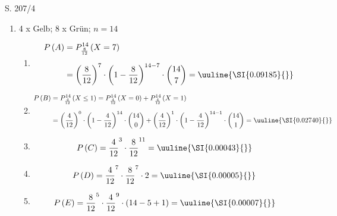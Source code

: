 \begin{Exercise}{S. 207/4}{}
\begin{enumerate}[leftmargin=*]
    \item [4.]{
        4 x Gelb; 8 x Grün; \quad $n = 14$\\[-1.0ex]
        \begin{enumerate}[label=\alph*),leftmargin=*]
            \item[a)] {
                \begin{align*}
                    P\left(A\right) &= P_{\frac{8}{12}}^{14}\left(X = 7\right)\\[1.5ex]
                    &= \left(\dfrac{8}{12}\right)^{7} \cdot \left(1 - \dfrac{8}{12}\right)^{14-7} \cdot \binom{14}{7} = \uuline{\SI{0.09185}{}}
                \end{align*}
                }
            \item[b)] {
                \begin{align*}
                    P\left(B\right) &= P_{\frac{4}{12}}^{14}\left(X \leq 1\right) = P_{\frac{4}{12}}^{14}\left(X = 0\right) + P_{\frac{4}{12}}^{14}\left(X = 1\right)\\[1.5ex]
                    &= \left(\dfrac{4}{12}\right)^{0} \cdot \left(1 - \dfrac{4}{12}\right)^{14} \cdot \binom{14}{0} + \left(\dfrac{4}{12}\right)^{1} \cdot \left(1 - \dfrac{4}{12}\right)^{14-1} \cdot \binom{14}{1} = \uuline{\SI{0.02740}{}}
                \end{align*}
                }
            \item[c)] {
                \begin{align*}
                    P\left(C\right) &= \dfrac{4}{12}^{3} \cdot \dfrac{8}{12}^{11} = \uuline{\SI{0.00043}{}}
                \end{align*}
                }
            \item[d)] {
                \begin{align*}
                    P\left(D\right) &= \dfrac{4}{12}^{7} \cdot \dfrac{8}{12}^{7} \cdot 2 = \uuline{\SI{0.00005}{}}
                \end{align*}
                }
            \item[e)] {
                \begin{align*}
                    P\left(E\right) &= \dfrac{8}{12}^{5} \cdot \dfrac{4}{12}^{9} \cdot (14 - 5 + 1) = \uuline{\SI{0.00007}{}}
                \end{align*}
                }
        \end{enumerate}
    }
\end{enumerate}
\end{Exercise}
\pagebreak

